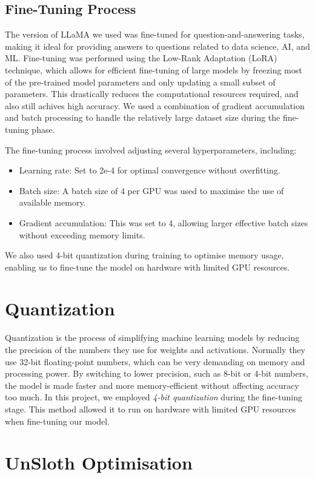 \documentclass[10pt]{article}
\begin{document}
\subsection{Fine-Tuning Process}

The version of LLaMA we used was fine-tuned for question-and-answering tasks, making it ideal for providing answers
to questions related to data science, AI, and ML.
Fine-tuning was performed using the Low-Rank Adaptation (LoRA) technique, which allows for efficient fine-tuning
of large models by freezing most of the pre-trained model parameters and only updating a small subset of parameters.
This drastically reduces the computational resources required, and also still achives high accuracy. We used
a combination of gradient accumulation and batch processing to handle the relatively large dataset size during
the fine-tuning phase.

The fine-tuning process involved adjusting several hyperparameters, including:
\begin{itemize}
    \item Learning rate: Set to 2e-4 for optimal convergence without overfitting.
    \item Batch size: A batch size of 4 per GPU was used to maximise the use of available memory.
    \item Gradient accumulation: This was set to 4, allowing larger effective batch sizes without exceeding memory limits.
\end{itemize}
We also used 4-bit quantization during training to optimise memory usage, enabling us to fine-tune the model on hardware with limited GPU resources.

\section{Quantization}

Quantization is the process of simplifying machine learning models by reducing the precision of the numbers they use for weights and
activations. Normally they use 32-bit floating-point numbers, which can be very demanding on memory and processing power.
By switching to lower precision, such as 8-bit or 4-bit numbers, the model is made faster and more memory-efficient
without affecting accuracy too much. In this project, we employed \textit{4-bit quantization} during the fine-tuning stage.
This method allowed it to run on hardware with limited GPU resources when fine-tuning our model.

\section{UnSloth Optimisation}
\end{document}
